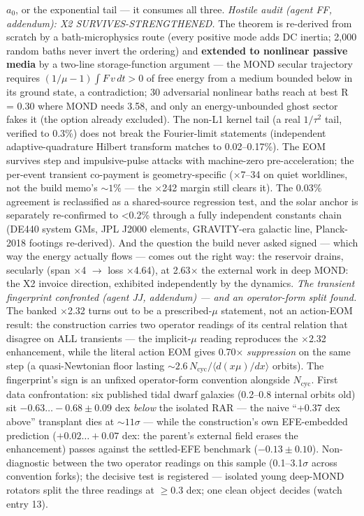 \documentclass[11pt,a4paper]{article}
\begin{document}
$a_{0}$, or the exponential tail --- it consumes all three. \emph{Hostile audit (agent FF, addendum): X2 SURVIVES-STRENGTHENED.} The theorem is re-derived from scratch by a bath-microphysics route (every positive mode adds DC inertia; 2,000 random baths never invert the ordering) and \textbf{extended to nonlinear passive media} by a two-line storage-function argument --- the MOND secular trajectory requires $(1/\mu - 1)\int F\,v\,dt > 0$ of free energy from a medium bounded below in its ground state, a contradiction; 30 adversarial nonlinear baths reach at best R = 0.30 where MOND needs 3.58, and only an energy-unbounded ghost sector fakes it (the option already excluded). The non-L1 kernel tail (a real $1/\tau^2$ tail, verified to 0.3\%) does not break the Fourier-limit statements (independent adaptive-quadrature Hilbert transform matches to 0.02--0.17\%). The EOM survives step and impulsive-pulse attacks with machine-zero pre-acceleration; the per-event transient co-payment is geometry-specific ($\times$7--34 on quiet worldlines, not the build memo's ${\sim}1\%$ --- the $\times$242 margin still clears it). The 0.03\% agreement is reclassified as a shared-source regression test, and the solar anchor is separately re-confirmed to <0.2\% through a fully independent constants chain (DE440 system GMs, JPL J2000 elements, GRAVITY-era galactic line, Planck-2018 footings re-derived). And the question the build never asked signed --- which way the energy actually flows --- comes out the right way: the reservoir drains, secularly (span $\times$4 $\to$ loss $\times$4.64), at 2.63$\times$ the external work in deep MOND: the X2 invoice direction, exhibited independently by the dynamics. \emph{The transient fingerprint confronted (agent JJ, addendum) --- and an operator-form split found.} The banked $\times$2.32 turns out to be a prescribed-$\mu$ statement, not an action-EOM result: the construction carries two operator readings of its central relation that disagree on ALL transients --- the implicit-$\mu$ reading reproduces the $\times$2.32 enhancement, while the literal action EOM gives 0.70$\times$ \emph{suppression} on the same step (a quasi-Newtonian floor lasting ${\sim}2.6\,N_{\mathrm{cyc}}/\langle d(x\mu)/dx\rangle$ orbits). The fingerprint's sign is an unfixed operator-form convention alongside $N_{\mathrm{cyc}}$. First data confrontation: six published tidal dwarf galaxies (0.2--0.8 internal orbits old) sit $-0.63\ldots-0.68 \pm 0.09$ dex \emph{below} the isolated RAR --- the naive ``+0.37 dex above'' transplant dies at ${\sim}11\sigma$ --- while the construction's own EFE-embedded prediction ($+0.02\ldots+0.07$ dex: the parent's external field erases the enhancement) passes against the settled-EFE benchmark ($-0.13 \pm 0.10$). Non-diagnostic between the two operator readings on this sample (0.1--3.1$\sigma$ across convention forks); the decisive test is registered --- isolated young deep-MOND rotators split the three readings at $\ge$0.3 dex; one clean object decides (watch entry 13).
\end{document}
